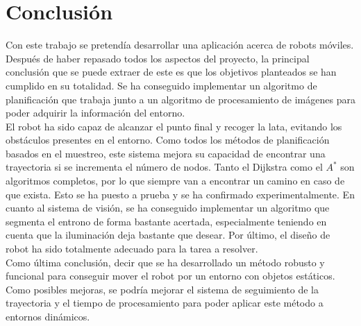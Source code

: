 \chapter{Conclusión}
\label{conclusion}

Con este trabajo se pretendía desarrollar una aplicación acerca de robots móviles. Después de haber repasado todos los aspectos del proyecto, la principal conclusión que se puede extraer de este es que los objetivos planteados se han cumplido en su totalidad. Se ha conseguido implementar un algoritmo de planificación que trabaja junto a un algoritmo de procesamiento de imágenes para poder adquirir la información del entorno.\\

El robot ha sido capaz de alcanzar el punto final y recoger la lata, evitando los obstáculos presentes en el entorno. Como todos los métodos de planificación basados en el muestreo, este sistema mejora su capacidad de encontrar una trayectoria si se incrementa el número de nodos. Tanto el Dijkstra como el $A^*$ son algoritmos completos, por lo que siempre van a encontrar un camino en caso de que exista. Esto se ha puesto a prueba y se ha confirmado experimentalmente. En cuanto al sistema de visión, se ha conseguido implementar un algoritmo que segmenta el entrono de forma bastante acertada, especialmente teniendo en cuenta que la iluminación deja bastante que desear. Por último, el diseño de robot ha sido totalmente adecuado para la tarea a resolver.\\

Como última conclusión, decir que se ha desarrollado un método robusto y funcional para conseguir mover el robot por un entorno con objetos estáticos. Como posibles mejoras, se podría mejorar el sistema de seguimiento de la trayectoria y el tiempo de procesamiento para poder aplicar este método a entornos dinámicos.\\